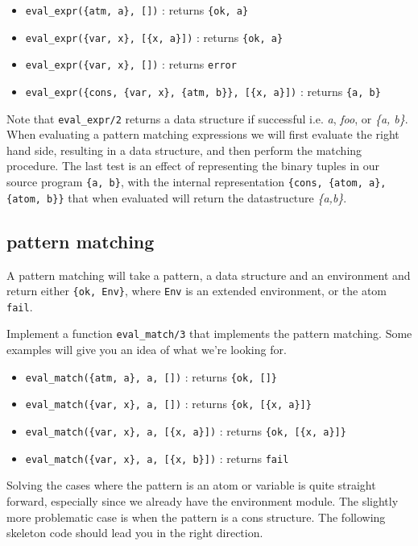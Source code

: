 \documentclass[a4paper,11pt]{article}
\begin{document}
\begin{itemize}
 \item {\tt eval\_expr(\{atm, a\}, [])} : returns {\tt \{ok, a\}}
 \item {\tt eval\_expr(\{var, x\},  [\{x, a\}])} : returns {\tt \{ok,  a\}}
 \item {\tt eval\_expr(\{var, x\},  [])} : returns {\tt error}
 \item {\tt eval\_expr(\{cons, \{var, x\}, \{atm, b\}\},  [\{x, a\}])} : returns {\tt \{a, b\}} 
\end{itemize}


Note that {\tt eval\_expr/2} returns a data structure if successful
i.e. {\em a}, {\em foo}, or {\em \{a, b\}}. When evaluating a
pattern matching expressions we will first evaluate the right hand
side, resulting in a data structure, and then perform the matching
procedure. The last test is an effect of representing the binary
tuples in our source program {\tt \{a, b\}}, with the internal
representation {\tt \{cons, \{atom, a\}, \{atom, b\}\}} that when
evaluated will return the datastructure {\it \{a,b\}}.

\subsection{pattern matching}

A pattern matching will take a pattern, a data structure and an
environment and return either {\tt \{ok, Env\}}, where {\tt Env} is an
extended environment, or the atom {\tt fail}. 

Implement a function {\tt eval\_match/3} that implements
the pattern matching. Some examples will give you an idea of what
we're looking for.

\begin{itemize}
 \item {\tt eval\_match(\{atm, a\}, a, [])} : returns {\tt \{ok, []\}}
 \item {\tt eval\_match(\{var, x\}, a, [])} : returns {\tt \{ok, [\{x, a\}]\}}
 \item {\tt eval\_match(\{var, x\}, a, [\{x, a\}])} : returns {\tt \{ok, [\{x, a\}]\}}
 \item {\tt eval\_match(\{var, x\}, a, [\{x, b\}])} : returns {\tt fail}
\end{itemize}

Solving the cases where the pattern is an atom or variable is quite
straight forward, especially since we already have the environment
module. The slightly more problematic case is when the pattern is a
cons structure. The following skeleton code should lead you in the
right direction.
\end{document}
